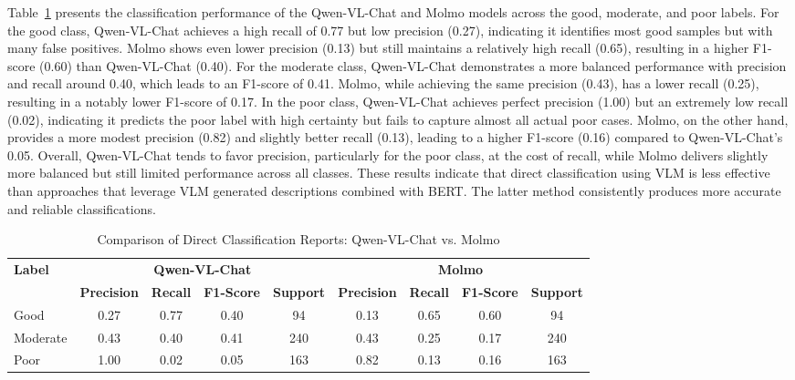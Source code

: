 \documentclass[11pt]{article}
\begin{document}
Table~\ref{tab:direct_compare} presents the classification performance of the Qwen-VL-Chat and Molmo models across the good, moderate, and poor labels. For the good class, Qwen-VL-Chat achieves a high recall of 0.77 but low precision (0.27), indicating it identifies most good samples but with many false positives. Molmo shows even lower precision (0.13) but still maintains a relatively high recall (0.65), resulting in a higher F1-score (0.60) than Qwen-VL-Chat (0.40). For the moderate class, Qwen-VL-Chat demonstrates a more balanced performance with precision and recall around 0.40, which leads to an F1-score of 0.41. Molmo, while achieving the same precision (0.43), has a lower recall (0.25), resulting in a notably lower F1-score of 0.17. In the poor class, Qwen-VL-Chat achieves perfect precision (1.00) but an extremely low recall (0.02), indicating it predicts the poor label with high certainty but fails to capture almost all actual poor cases. Molmo, on the other hand, provides a more modest precision (0.82) and slightly better recall (0.13), leading to a higher F1-score (0.16) compared to Qwen-VL-Chat’s 0.05. Overall, Qwen-VL-Chat tends to favor precision, particularly for the poor class, at the cost of recall, while Molmo delivers slightly more balanced but still limited performance across all classes. These results indicate that direct classification using VLM is less effective than approaches that leverage VLM generated descriptions combined with BERT. The latter method consistently produces more accurate and reliable classifications. 

\begin{table}[H]
\centering
\caption{Comparison of Direct Classification Reports: Qwen-VL-Chat vs. Molmo}
\label{tab:direct_compare}
\begin{tabular}{l|cccc|cccc}
\hline
\multirow{2}{*}{\textbf{Label}} & \multicolumn{4}{c|}{\textbf{Qwen-VL-Chat}} & \multicolumn{4}{c}{\textbf{Molmo}} \\
 & \textbf{Precision} & \textbf{Recall} & \textbf{F1-Score} & \textbf{Support} & \textbf{Precision} & \textbf{Recall} & \textbf{F1-Score} & \textbf{Support} \\
\hline
Good      & 0.27 & 0.77 & 0.40 & 94  & 0.13 & 0.65 & 0.60 & 94  \\
Moderate  & 0.43 & 0.40 & 0.41 & 240 & 0.43 & 0.25 & 0.17 & 240 \\
Poor      & 1.00 & 0.02 & 0.05 & 163 & 0.82 & 0.13 & 0.16 & 163 \\
\hline
\end{tabular}
\end{table}
\end{document}
